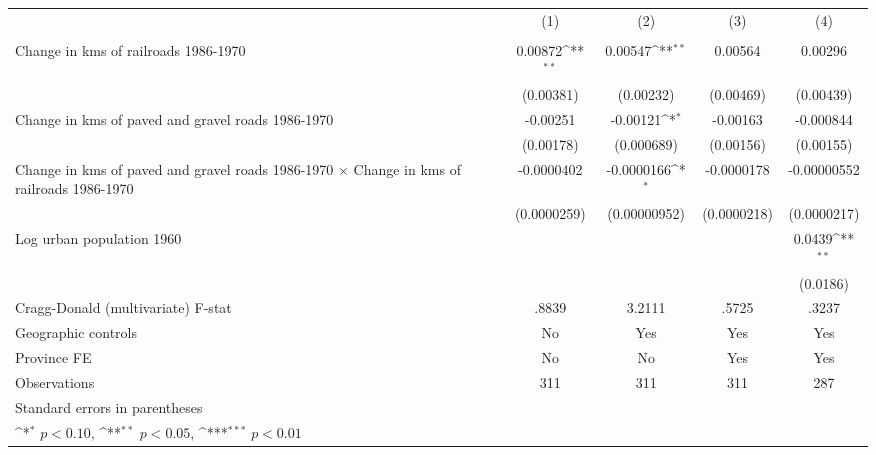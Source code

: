 {
\def\sym#1{\ifmmode^{#1}\else\(^{#1}\)\fi}
\begin{tabular}{l*{4}{c}}
\hline\hline
                &\multicolumn{1}{c}{(1)}&\multicolumn{1}{c}{(2)}&\multicolumn{1}{c}{(3)}&\multicolumn{1}{c}{(4)}\\
                &\multicolumn{1}{c}{}&\multicolumn{1}{c}{}&\multicolumn{1}{c}{}&\multicolumn{1}{c}{}\\
\hline
Change in kms of railroads 1986-1970&  0.00872\sym{**} &  0.00547\sym{**} &  0.00564         &  0.00296         \\
                &(0.00381)         &(0.00232)         &(0.00469)         &(0.00439)         \\
[1em]
Change in kms of paved and gravel roads 1986-1970& -0.00251         & -0.00121\sym{*}  & -0.00163         &-0.000844         \\
                &(0.00178)         &(0.000689)         &(0.00156)         &(0.00155)         \\
[1em]
Change in kms of paved and gravel roads 1986-1970 $\times$ Change in kms of railroads 1986-1970&-0.0000402         &-0.0000166\sym{*}  &-0.0000178         &-0.00000552         \\
                &(0.0000259)         &(0.00000952)         &(0.0000218)         &(0.0000217)         \\
[1em]
Log urban population 1960&                  &                  &                  &   0.0439\sym{**} \\
                &                  &                  &                  & (0.0186)         \\
\hline
Cragg-Donald (multivariate) F-stat&    .8839         &   3.2111         &    .5725         &    .3237         \\
Geographic controls&       No         &      Yes         &      Yes         &      Yes         \\
Province FE     &       No         &       No         &      Yes         &      Yes         \\
Observations    &      311         &      311         &      311         &      287         \\
\hline\hline
\multicolumn{5}{l}{\footnotesize Standard errors in parentheses}\\
\multicolumn{5}{l}{\footnotesize \sym{*} \(p<0.10\), \sym{**} \(p<0.05\), \sym{***} \(p<0.01\)}\\
\end{tabular}
}

